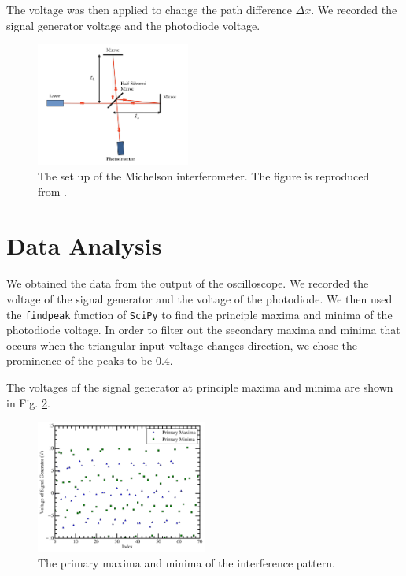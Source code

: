 The voltage was then applied to change the path difference $\Delta x$. We recorded the signal generator voltage and the photodiode voltage. 
\begin{figure}[h]
    \centering
    \includegraphics[width=0.45\textwidth]{fig/michelson_setup.png}
    \caption{The set up of the Michelson interferometer. The figure is reproduced from \cite{MITOpticalInterferometry2023}.}
    \label{fig:set_up}
\end{figure}

\section{Data Analysis}
We obtained the data from the output of the oscilloscope. We recorded the voltage of the signal generator and the voltage of the photodiode. We then used the \texttt{findpeak} function of \texttt{SciPy} to find the principle maxima and minima of the photodiode voltage. In order to filter out the secondary maxima and minima that occurs when the triangular input voltage changes direction, we chose the prominence of the peaks to be $0.4$.

The voltages of the signal generator at principle maxima and minima are shown in Fig. \ref{fig:data}. 
\begin{figure}[h]
    \centering
    \includegraphics[width=0.5\textwidth]{fig/Primary_Maxima_Minima.png}
    \caption{The primary maxima and minima of the interference pattern.}
    \label{fig:data}
\end{figure}

